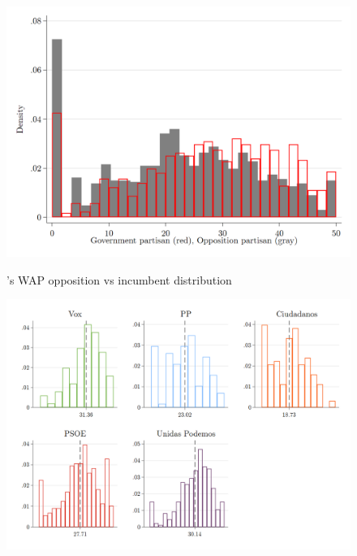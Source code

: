 \documentclass[a4paper, svgnames]{article}
\newcommand{\citeposs}[1]{\citeauthor{#1}'s \citeyearpar{#1}}
\begin{document}
\begin{figure}[H]
	\centering
	\caption{\citeposs{Wagner2021} WAP opposition vs incumbent distribution}

	\includegraphics[width=\textwidth]{Figures/AP_index_by_partisanship_wagner.png}
	\label{fig:WAP_oppo_incumb}

\end{figure}

\begin{figure}[H]
	\centering
	\includegraphics[width=\textwidth]{Figures/AP_index_by_party_id_wagner.png}
\end{figure}
\end{document}

